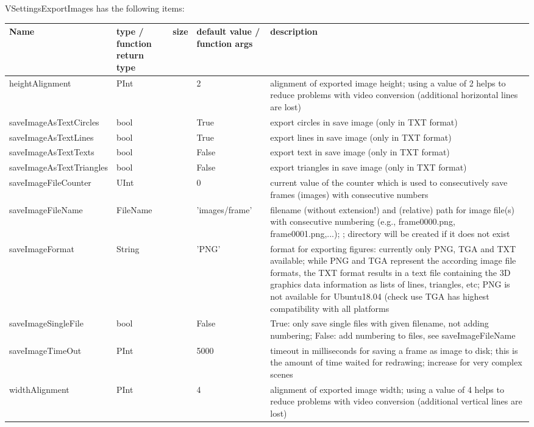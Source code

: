 \noindent VSettingsExportImages has the following items:
\begin{center}
  \footnotesize
  \begin{longtable}{| p{4.2cm} | p{2.5cm} | p{0.3cm} | p{3.0cm} | p{6cm} |}
    \hline
    \bf Name & \bf type / function return type & \bf size & \bf default value / function args & \bf description \\ \hline
    heightAlignment &     PInt &      &     2 &     alignment of exported image height; using a value of 2 helps to reduce problems with video conversion (additional horizontal lines are lost)\\ \hline
    saveImageAsTextCircles &     bool &      &     True &     export circles in save image (only in TXT format)\\ \hline
    saveImageAsTextLines &     bool &      &     True &     export lines in save image (only in TXT format)\\ \hline
    saveImageAsTextTexts &     bool &      &     False &     export text in save image (only in TXT format)\\ \hline
    saveImageAsTextTriangles &     bool &      &     False &     export triangles in save image (only in TXT format)\\ \hline
    saveImageFileCounter &     UInt &      &     0 &     current value of the counter which is used to consecutively save frames (images) with consecutive numbers\\ \hline
    saveImageFileName &     FileName &      &     'images/frame' &     filename (without extension!) and (relative) path for image file(s) with consecutive numbering (e.g., frame0000.png, frame0001.png,...); ; directory will be created if it does not exist\\ \hline
    saveImageFormat &     String &      &     'PNG' &     format for exporting figures: currently only PNG, TGA and TXT available; while PNG and TGA represent the according image file formats, the TXT format results in a text file containing the 3D graphics data information as lists of lines, triangles, etc; PNG is not available for Ubuntu18.04 (check  use TGA has highest compatibility with all platforms\\ \hline
    saveImageSingleFile &     bool &      &     False &     True: only save single files with given filename, not adding numbering; False: add numbering to files, see saveImageFileName\\ \hline
    saveImageTimeOut &     PInt &      &     5000 &     timeout in milliseconds for saving a frame as image to disk; this is the amount of time waited for redrawing; increase for very complex scenes\\ \hline
    widthAlignment &     PInt &      &     4 &     alignment of exported image width; using a value of 4 helps to reduce problems with video conversion (additional vertical lines are lost)\\ \hline
	  \end{longtable}
	\end{center}


